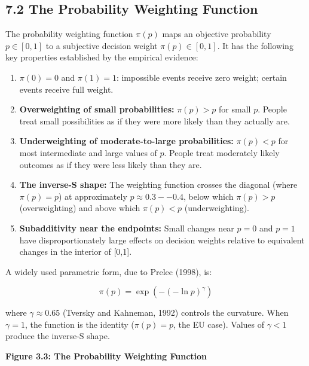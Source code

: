 \documentclass[12pt, letterpaper]{article}
\begin{document}
\subsection{7.2 The Probability Weighting Function}


The probability weighting function $\pi(p)$ maps an objective probability $p \in [0,1]$ to a subjective decision weight $\pi(p) \in [0,1]$. It has the following key properties established by the empirical evidence:

\begin{enumerate}
\item $\pi(0) = 0$ and $\pi(1) = 1$: impossible events receive zero weight; certain events receive full weight.
\item \textbf{Overweighting of small probabilities:} $\pi(p) > p$ for small $p$. People treat small possibilities as if they were more likely than they actually are.
\item \textbf{Underweighting of moderate-to-large probabilities:} $\pi(p) < p$ for most intermediate and large values of $p$. People treat moderately likely outcomes as if they were less likely than they are.
\item \textbf{The inverse-S shape:} The weighting function crosses the diagonal (where $\pi(p) = p$) at approximately $p \approx 0.3--0.4$, below which $\pi(p) > p$ (overweighting) and above which $\pi(p) < p$ (underweighting).
\item \textbf{Subadditivity near the endpoints:} Small changes near $p = 0$ and $p = 1$ have disproportionately large effects on decision weights relative to equivalent changes in the interior of [0,1].
\end{enumerate}

A widely used parametric form, due to Prelec (1998), is:

$$\pi(p) = \exp(-(-\ln p)^\gamma)$$

where $\gamma \approx 0.65$ (Tversky and Kahneman, 1992) controls the curvature. When $\gamma = 1$, the function is the identity ($\pi(p) = p$, the EU case). Values of $\gamma < 1$ produce the inverse-S shape.

\textbf{Figure 3.3: The Probability Weighting Function}
\end{document}
